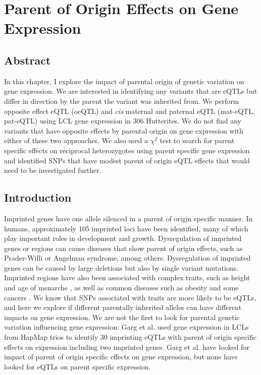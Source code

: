 
\chapter{Parent of Origin Effects on Gene Expression }\label{ch:poeqtl}
\section[Abstract]{Abstract}

In this chapter, I explore the impact of parental origin of genetic variation on gene expression. We are interested in identifying any variants that are eQTLs but differ in direction by the parent the variant was inherited from. We perform opposite effect eQTL (oeQTL) and \emph{cis} maternal and paternal eQTL (mat-eQTL, pat-eQTL) using LCL gene expression in 306 Hutterites. We do not find any variants that have opposite effects by parental origin on gene expression with either of these two approaches. We also used a $\chi^2$ test to search for parent specific effects on reciprocal heterozygotes using parent specific gene expression and identified SNPs that have modest parent of origin eQTL effects that would need to be investigated further.

\section{Introduction}\label{ch04-introduction}
Imprinted genes have one allele silenced in a parent of origin specific manner. In humans, approximately 105 imprinted loci have been identified, many of which play important roles in development and growth\cite{Falls1999,Peters2014}. Dysregulation of imprinted genes or regions can cause diseases that show parent of origin effects, such as Prader-Willi or Angelman syndrome, among others\cite{Peters2014}. Dysregulation of imprinted genes can be caused by large deletions but also by single variant mutations. Imprinted regions have also been associated with complex traits, such as height and age of menarche \cite{Benonisdottir:2016dz,Zoledziewska:2015do}, as well as common diseases such as obesity and some cancers \cite{Peters2014}. We know that SNPs associated with traits are more likely to be eQTLs\citep{Nicolae2010}, and here we explore if different parentally inherited alleles can have different impacts on gene expression. We are not the first to look for parental genetic variation influencing gene expression: Garg et al. used gene expression in LCLs from HapMap trios to identify 30 imprinting eQTLs with parent of origin specific effects on expression including two imprinted genes\cite{Garg2012a}. Garg et al. have looked for impact of parent of origin specific effects on gene expression\citep{Garg2012a}, but none have looked for eQTLs on parent specific expression. 
	
